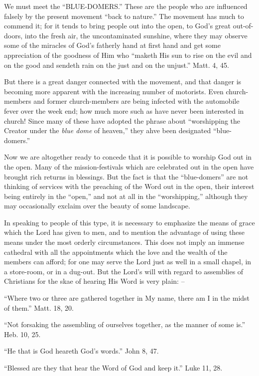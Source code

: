 \documentclass[
]{book}
\begin{document}
We must meet the ``BLUE-DOMERS.'' These are the people who are influenced falsely by the present movement ``back to nature.'' The movement has much to commend it; for it tends to bring people out into the open, to God's great out-of-doors, into the fresh air, the uncontaminated sunshine, where they may observe some of the miracles of God's fatherly hand at first hand and get some appreciation of the goodness of Him who ``maketh His sun to rise on the evil and on the good and sendeth rain on the just and on the unjust.'' Matt. 4, 45.

But there is a great danger connected with the movement, and that danger is becoming more apparent with the increasing number of motorists. Even church-members and former church-members are being infected with the automobile fever over the week end; how much more such as have never been interested in church! Since many of these have adopted the phrase about ``worshipping the Creator under the \emph{blue dome} of heaven,'' they ahve been designated ``blue-domers.''

Now we are altogether ready to concede that it is possible to worship God out in the open. Many of the mission-festivals which are celebrated out in the open have brought rich returns in blessings. But the fact is that the ``blue-domers'' are not thinking of services with the preaching of the Word out in the open, their interest being entirely in the ``open,'' and not at all in the ``worshipping,'' although they may occasionally exclaim over the beauty of some landscape.

In speaking to people of this type, it is necessary to emphasize the means of grace which the Lord has given to men, and to mention the advantage of using these means under the most orderly circumstances. This does not imply an immense cathedral with all the appointments which the love and the wealth of the members can afford; for one may serve the Lord just as well in a small chapel, in a store-room, or in a dug-out. But the Lord's will with regard to assemblies of Christians for the skae of hearing His Word is very plain: --

``Where two or three are gathered together in My name, there am I in the midst of them.'' Matt. 18, 20.

``Not forsaking the assembling of ourselves together, as the manner of some is.'' Heb. 10, 25.

``He that is God heareth God's words.'' John 8, 47.

``Blessed are they that hear the Word of God and keep it.'' Luke 11, 28.
\end{document}
